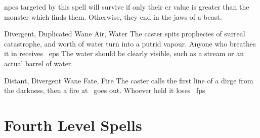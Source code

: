 \begin{multicols}{2}
{    \Glspl{npc} targeted by this spell will survive if only their \gls{cr} value is greater than the monster which finds them.
    Otherwise, they end in the jaws of a beast.
  }

  {Divergent, Duplicated}%
  {Wane}%
  {Air, Water}%
  {}%
  {The caster spits prophecies of surreal catastrophe, and  worth of water turn into a putrid vapour.
  Anyone who breathes it in receives ~\glspl{ep}}%
  {
    The water should be clearly visible, such as a stream or an actual barrel of water.}

  {Distant, Divergent}%
  {Wane}%
  {Fate, Fire}%
  {}%
  {The caster calls the first line of a dirge from the darkness, then a fire at \spellRange\ goes out.
  Whoever held it loses \showDam~\glspl{fp}}%
  {}


\end{multicols}

\filbreak
\section{Fourth Level Spells}

